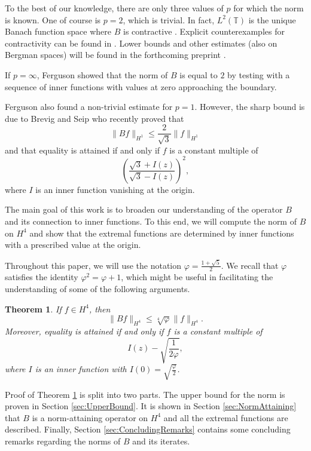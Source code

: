 \documentclass{amsart}
\theoremstyle{plain}
\newtheorem{theo}{Theorem}[section]
\theoremstyle{definition}
\newcommand{\T}{\mathbb{T}}
\begin{document}
    	To the best of our knowledge, there are only three values of $p$ for which the norm is known. One of course is $p=2$, which is trivial. In fact, $L^2 (\T)$ is the unique Banach function space where $B$ is contractive \cite{MR4643433}. Explicit counterexamples for contractivity can be found in \cite[Lemma 2.3]{MR4386412}. Lower bounds and other estimates (also on Bergman spaces) will be found in the forthcoming preprint \cite{JimenezVukotic}.
    	
    	If $p = \infty$, Ferguson \cite{MR3770837} showed that the norm of $B$ is equal to $2$ by testing with a sequence of inner functions with values at zero approaching the boundary.
    	
    	Ferguson also found a non-trivial estimate for $p = 1$. However, the sharp bound is due to Brevig and Seip \cite{MR4796279} who recently proved that
    	\[
    	\| Bf \|_{H^1} \leq \dfrac{2}{\sqrt{3}} \|f\|_{H^1}
    	\]
    	and that equality is attained if and only if $f$ is a constant multiple of
    	\[
    	\left(\dfrac{\sqrt{3} + I(z)}{\sqrt{3} - I(z)} \right)^2,
    	\]
    	where $I$ is an inner function vanishing at the origin.
    	
    	The main goal of this work is to broaden our understanding of the operator $B$ and its connection to inner functions. To this end, we will compute the norm of $B$ on $H^4$ and show that the extremal functions are determined by inner functions with a prescribed value at the origin. 
    	
    	Throughout this paper, we will use the notation $\varphi = \frac{1 + \sqrt{5}}{2}$. We recall that $\varphi$ satisfies the identity $\varphi^2 = \varphi + 1$, which might be useful in facilitating the understanding of some of the following arguments.
    	
    	\begin{theo} \label{thm:NormH4}
    		If $f \in H^4$, then
    		\[
    		\| B f \|_{H^4} \leq \sqrt[4]{\varphi} \| f\|_{H^4}.
    		\]
    		Moreover, equality is attained if and only if $f$ is a constant multiple of
    		\[
    		I(z) - \sqrt{\dfrac{1}{2\varphi}},
    		\]
    		where $I$ is an inner function with $I(0)=\sqrt{\frac{\varphi}{2}}$.
    	\end{theo}
	
	    Proof of Theorem \ref{thm:NormH4} is split into two parts. The upper bound for the norm is proven in Section \ref{sec:UpperBound}. It is shown in Section \ref{sec:NormAttaining} that $B$ is a norm-attaining operator on $H^4$ and all the extremal functions are described. Finally, Section \ref{sec:ConcludingRemarks} contains some concluding remarks regarding the norms of $B$ and its iterates.
	
\end{document}
